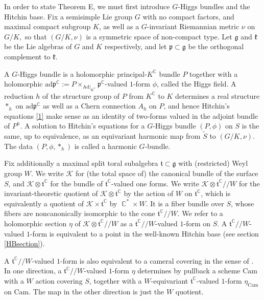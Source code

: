 \documentclass[10pt]{amsart}
\newcommand{\p}{\mathfrak{p}}
\newcommand{\g}{\mathfrak{g}}
\newcommand{\ft}{\mathfrak{t}}
\theoremstyle{definition}
\DeclareMathOperator{\C}{\mathbb{C}}
\begin{document}
In order to state Theorem E, we must first introduce $G$-Higgs bundles and the Hitchin base. Fix a semisimple Lie group $G$ with no compact factors, and maximal compact subgroup $K$, as well as a $G$-invariant Riemannian metric $\nu$ on $G/K,$ so that $(G/K,\nu)$ is a symmetric space of non-compact type. Let $\mathfrak{g}$ and $\mathfrak{k}$ be the Lie algebras of $G$ and $K$ respectively, and let $\mathfrak{p} \subset \mathfrak{g}$ be the orthogonal complement to $\mathfrak{k}$. 

A $G$-Higgs bundle is a holomorphic principal-$K^{\C}$ bundle $P$ together with a holomorphic $\mathrm{ad}\p^{\C} := P\times_{\textrm{Ad}|_{K^{\C}}} \p^{\C}$-valued $1$-form $\phi$, called the Higgs field. A reduction $h$ of the structure group of $P$ from $K^{\C}$ to $K$ determines a real structure $*_h$ on $\textrm{ad}\p^{\C}$ as well as a Chern connection $A_h$ on $P$, and hence Hitchin's equations \eqref{1} make sense as an identity of two-forms valued in the adjoint bundle of $P^h$. A solution to Hitchin's equations for a $G$-Higgs bundle $(P,\phi)$ on $S$ is the same, up to equivalence, as an equivariant harmonic map from $\tilde{S}$ to $(G/K,\nu).$ The data $(P,\phi,*_h)$ is called a harmonic $G$-bundle.

Fix additionally a maximal split toral subalgebra $\ft\subset \g$ with (restricted) Weyl group $W$. We write $\mathcal{K}$ for (the total space of) the canonical bundle of the surface $S$, and $\mathcal{K} \otimes \ft^{\C}$ for the bundle of $\ft^{\C}$-valued one forms. We write $\mathcal{K} \otimes \ft^{\C} // W$ for the invariant-theoretic quotient of $\mathcal{K} \otimes \ft^{\C}$ by the action of $W$ on $\ft^{\C}$, which is equivalently a quotient of $\mathcal{K} \times \ft^{\C}$ by $\C^* \times W$. It is a fiber bundle over $S$, whose fibers are noncanonically isomorphic to the cone $\ft^{\C}//W$. We refer to a holomorphic section $\eta$ of $\mathcal{K} \otimes \ft^{\C} // W$ as a $\ft^{\C} // W$-valued $1$-form on $S$. A $\ft^{\C} // W$-valued $1$-form is equivalent to a point in the well-known Hitchin base (see section \ref{HBsection}).

A $\ft^{\C} // W$-valued $1$-form is also equivalent to a cameral covering in the sense of \cite[section 2]{Don}. In one direction, a $\ft^{\C}//W$-valued $1$-form $\eta$ determines by pullback a scheme $\mathrm{Cam}$ with a $W$ action covering $S$, together with a $W$-equivariant $\ft^{\C}$-valued $1$-form $\eta_{\mathrm{Cam}}$ on $\mathrm{Cam}$. The map in the other direction is just the $W$ quotient.
\end{document}
